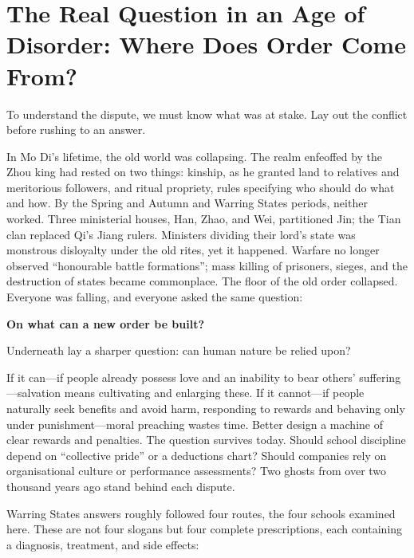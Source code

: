 \section[Where Does Order Come From?]{The Real Question in an Age of Disorder: Where Does Order Come From?}
To understand the dispute, we must know what was at stake. Lay out the conflict before rushing to an answer.

In Mo Di's lifetime, the old world was collapsing. The realm enfeoffed by the Zhou king had rested on two things: kinship, as he granted land to relatives and meritorious followers, and ritual propriety, rules specifying who should do what and how. By the Spring and Autumn and Warring States periods, neither worked. Three ministerial houses, Han, Zhao, and Wei, partitioned Jin; the Tian clan replaced Qi's Jiang rulers. Ministers dividing their lord's state was monstrous disloyalty under the old rites, yet it happened. Warfare no longer observed ``honourable battle formations''; mass killing of prisoners, sieges, and the destruction of states became commonplace. The floor of the old order collapsed. Everyone was falling, and everyone asked the same question:

\textbf{On what can a new order be built?}

Underneath lay a sharper question: can human nature be relied upon?

If it can---if people already possess love and an inability to bear others' suffering---salvation means cultivating and enlarging these. If it cannot---if people naturally seek benefits and avoid harm, responding to rewards and behaving only under punishment---moral preaching wastes time. Better design a machine of clear rewards and penalties. The question survives today. Should school discipline depend on ``collective pride'' or a deductions chart? Should companies rely on organisational culture or performance assessments? Two ghosts from over two thousand years ago stand behind each dispute.

Warring States answers roughly followed four routes, the four schools examined here. These are not four slogans but four complete prescriptions, each containing a diagnosis, treatment, and side effects:


